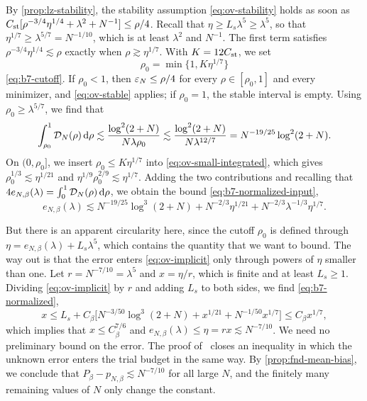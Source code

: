 By \cref{prop:lz-stability}, the stability assumption
\eqref{eq:ov-stability} holds as soon as
$C_{\rm st}[\rho^{-3/4}\eta^{1/4}+\lambda^2+N^{-1}]\le\rho/4$. Recall
that $\eta\ge L_s\lambda^5\ge\lambda^5$, so that
$\eta^{1/7}\ge\lambda^{5/7}=N^{-1/10}$, which is at least $\lambda^2$ and
$N^{-1}$. The first term satisfies $\rho^{-3/4}\eta^{1/4}\lesssim\rho$
exactly when $\rho\gtrsim\eta^{1/7}$. With $K=12C_{\rm st}$, we set
\[
 \rho_0=\min\{1,K\eta^{1/7}\}
\]
\eqref{eq:b7-cutoff}. If $\rho_0<1$, then $\varepsilon_N\le\rho/4$ for every
$\rho\in[\rho_0,1]$ and every minimizer, and \eqref{eq:ov-stable}
applies; if $\rho_0=1$, the stable interval is empty. Using
$\rho_0\ge\lambda^{5/7}$, we find that
\[
 \int_{\rho_0}^1\mathcal D_N(\rho)\,\mathrm d\rho
 \lesssim\frac{\log^2(2+N)}{N\lambda\rho_0}
 \lesssim\frac{\log^2(2+N)}{N\lambda^{12/7}}
 =N^{-19/25}\log^2(2+N).
\]
On $(0,\rho_0]$, we insert $\rho_0\le K\eta^{1/7}$ into
\eqref{eq:ov-small-integrated}, which gives
$\rho_0^{1/3}\lesssim\eta^{1/21}$ and
$\eta^{1/9}\rho_0^{2/9}\lesssim\eta^{1/7}$. Adding the two
contributions and recalling that
$4e_{N,\beta}(\lambda)=\int_0^1\mathcal D_N(\rho)\,\mathrm d\rho$, we obtain the
bound \eqref{eq:b7-normalized-input},
\begin{equation}\label{eq:ov-implicit}
 e_{N,\beta}(\lambda)\lesssim N^{-19/25}\log^3(2+N)
 +N^{-2/3}\eta^{1/21}+N^{-2/3}\lambda^{-1/3}\eta^{1/7}.
\end{equation}

But there is an apparent circularity here, since the cutoff $\rho_0$ is
defined through $\eta=e_{N,\beta}(\lambda)+L_s\lambda^5$, which contains
the quantity that we want to bound. The way out is that the error
enters \eqref{eq:ov-implicit} only through powers of $\eta$ smaller
than one. Let $r=N^{-7/10}=\lambda^5$ and $x=\eta/r$, which is finite
and at least $L_s\ge1$. Dividing \eqref{eq:ov-implicit} by $r$ and
adding $L_s$ to both sides, we find \eqref{eq:b7-normalized},
\[
 x\le L_s+C_\beta\bigl[N^{-3/50}\log^3(2+N)+x^{1/21}
 +N^{-1/50}x^{1/7}\bigr]\le C_\beta x^{1/7},
\]
which implies that $x\le C_\beta^{7/6}$ and
$e_{N,\beta}(\lambda)\le\eta=rx\lesssim N^{-7/10}$. We need no preliminary bound
on the error. The proof of~\cite[Proposition~7.7]{AL} closes
an inequality in which the unknown error enters the trial budget in the
same way. By \cref{prop:fnd-mean-bias}, we conclude that
$P_\beta-p_{N,\beta}\lesssim N^{-7/10}$ for all large $N$, and the
finitely many remaining values of $N$ only change the constant.

